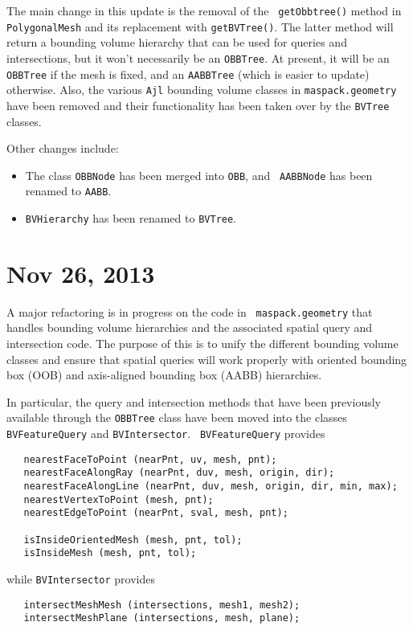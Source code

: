 \documentclass{article}
\begin{document}
The main change in this update is the removal of the {\tt
getObbtree()} method in {\tt PolygonalMesh} and its replacement with
{\tt getBVTree()}. The latter method will return a bounding
volume hierarchy that can be used for queries and intersections, but
it won't necessarily be an {\tt OBBTree}. At present, it will be an
{\tt OBBTree} if the mesh is fixed, and an {\tt AABBTree} (which is
easier to update) otherwise. Also, the various {\tt Ajl} bounding
volume classes in {\tt maspack.geometry} have been removed
and their functionality has been taken over by the {\tt BVTree}
classes.

Other changes include:

\begin{itemize}

\item The class {\tt OBBNode} has been merged into {\tt OBB}, and {\tt
AABBNode} has been renamed to {\tt AABB}.

\item {\tt BVHierarchy} has been renamed to {\tt BVTree}.

\end{itemize}

\section*{Nov 26, 2013}

A major refactoring is in progress on the code in {\tt
maspack.geometry} that handles bounding volume hierarchies and the
associated spatial query and intersection code. The purpose of this is
to unify the different bounding volume classes and ensure that spatial
queries will work properly with oriented bounding box (OOB) and
axis-aligned bounding box (AABB) hierarchies. 

In particular, the query and intersection methods that have been
previously available through the {\tt OBBTree} class have been moved
into the classes {\tt BVFeatureQuery} and {\tt BVIntersector}. {\tt
BVFeatureQuery} provides
\begin{lstlisting}
   nearestFaceToPoint (nearPnt, uv, mesh, pnt);
   nearestFaceAlongRay (nearPnt, duv, mesh, origin, dir);
   nearestFaceAlongLine (nearPnt, duv, mesh, origin, dir, min, max);
   nearestVertexToPoint (mesh, pnt);
   nearestEdgeToPoint (nearPnt, sval, mesh, pnt);

   isInsideOrientedMesh (mesh, pnt, tol);
   isInsideMesh (mesh, pnt, tol);
\end{lstlisting}
while {\tt BVIntersector} provides
\begin{lstlisting}
   intersectMeshMesh (intersections, mesh1, mesh2);
   intersectMeshPlane (intersections, mesh, plane);
\end{lstlisting}
\end{document}
